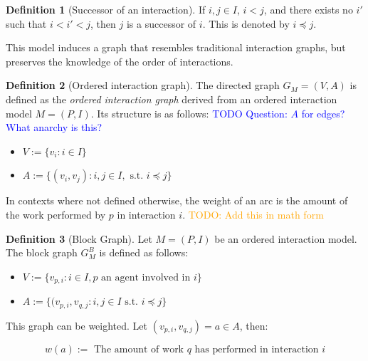 \documentclass[a4paper,11pt]{book}
\newcommand\nicetohave[1]{\textcolor{orange}{TODO: #1}}
\newcommand\question[1]{\textcolor{blue}{TODO Question: #1}}
\theoremstyle{definition}
\newtheorem{definition}{Definition}
\begin{document}
\begin{definition}[Successor of an interaction]
     If $i, j \in I$, $i < j$, and there exists no $i'$ such that $i < i' < j$, then
$j$ is a successor of $i$. This is denoted by $i \preceq j$.
\end{definition}
 
This model induces a graph that resembles traditional interaction graphs, but preserves the knowledge
of the order of interactions.
\begin{definition}[Ordered interaction graph]
    The directed graph $G_M = (V, A)$ is defined as the \emph{ordered interaction graph} derived from an ordered interaction model $M = (P,I)$.
    Its structure is as follows:
		\question{$A$ for edges? What anarchy is this?}

    \begin{itemize}
        \item $V := \{ v_{i} : i \in I\}$\\
        \item $A := \{ (v_{i}, v_{j}) : i, j \in I, \mbox{ s.t. } i \preceq j \}$\\
    \end{itemize}

    In contexts where not defined otherwise, the weight of an arc is the amount of the work performed by $p$ in
    interaction $i$. \nicetohave{Add this in math form}
\end{definition}


\begin{definition}[Block Graph]
    Let $M = (P, I)$ be an ordered interaction model. The block graph $G^B_{M}$ is defined as follows:

    \begin{itemize}
        \item $V := \{ v_{p, i} : i \in I, p \mbox{ an agent involved in } i \}$\\
        \item $A := \{ (v_{p,i}, v_{q,j} : i, j \in I \mbox{ s.t. } i \preceq j \}$\\
    \end{itemize}

    This graph can be weighted. Let $(v_{p,i}, v_{q, j}) = a \in A$, then:

    \begin{equation*}
        w(a) := \mbox{ The amount of work } q \mbox{ has performed in interaction } i 
    \end{equation*}
\end{definition}
\end{document}
